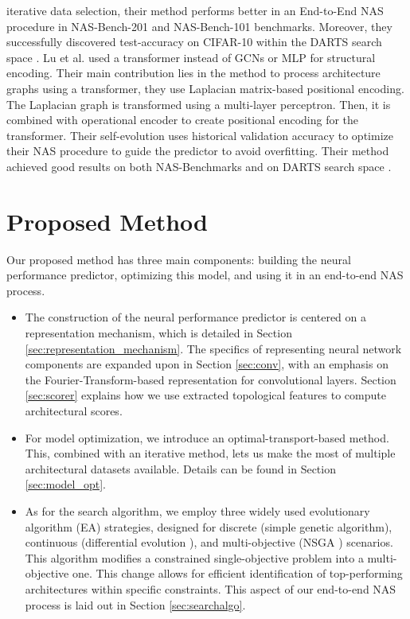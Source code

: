 \documentclass[lettersize,journal]{IEEEtran}
\begin{document}
iterative data selection, their method performs better in an End-to-End NAS procedure in NAS-Bench-201 \cite{nb201} and NAS-Bench-101 \cite{nb101} benchmarks. Moreover, they successfully discovered  test-accuracy on CIFAR-10 \cite{cifar} within the DARTS search space \cite{DARTS}. Lu et al. \cite{TNASP} used a transformer instead of GCNs or MLP for structural encoding. Their main contribution lies in the method to process architecture graphs using a transformer, they use Laplacian matrix-based positional encoding. The Laplacian graph is transformed using a multi-layer perceptron. Then, it is combined with operational encoder to create positional encoding for the transformer. Their self-evolution uses historical validation accuracy to optimize their NAS procedure to guide the predictor to avoid overfitting. Their method achieved good results on both NAS-Benchmarks and  on DARTS search space \cite{DARTS}.











\section{Proposed Method} \label{sec:method}








Our proposed method has three main components: building the neural performance predictor, optimizing this model, and using it in an end-to-end NAS process.

\begin{itemize}
    \item The construction of the neural performance predictor is centered on a representation mechanism, which is detailed in Section \ref{sec:representation_mechanism}. The specifics of representing neural network components are expanded upon in Section \ref{sec:conv}, with an emphasis on the Fourier-Transform-based representation for convolutional layers. Section \ref{sec:scorer} explains how we use extracted topological features to compute architectural scores.

    \item For model optimization, we introduce an optimal-transport-based method. This, combined with an iterative method, lets us make the most of multiple architectural datasets available. Details can be found in Section \ref{sec:model_opt}.

    \item As for the search algorithm, we employ three widely used evolutionary algorithm (EA) strategies, designed for discrete (simple genetic algorithm), continuous (differential evolution \cite{DE}), and multi-objective (NSGA \cite{NSGA}) scenarios. This algorithm modifies a constrained single-objective problem into a multi-objective one. This change allows for efficient identification of top-performing architectures within specific constraints. This aspect of our end-to-end NAS process is laid out in Section \ref{sec:searchalgo}.
\end{itemize}
\end{document}
